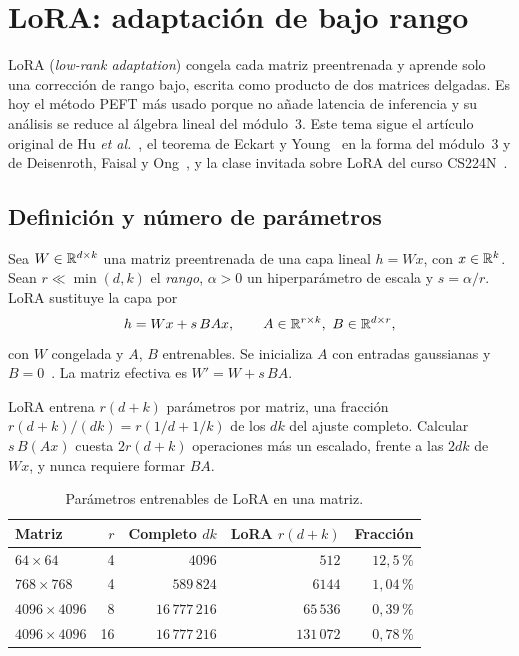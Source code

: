 \chapter{LoRA: adaptación de bajo rango}
\label{tema:5}

LoRA (\emph{low-rank adaptation}) congela cada matriz preentrenada y aprende solo una corrección de rango bajo, escrita como producto de dos matrices delgadas. Es hoy el método PEFT más usado porque no añade latencia de inferencia y su análisis se reduce al álgebra lineal del módulo~3. Este tema sigue el artículo original de Hu \emph{et al.}~\cite[§4 y~§7]{hu-lora}, el teorema de Eckart y Young~\cite{eckart-young} en la forma del módulo~3 y de Deisenroth, Faisal y Ong~\cite[§4.6]{mml}, y la clase invitada sobre LoRA del curso CS224N~\cite{cs224n}.

\section{Definición y número de parámetros}

\begin{definicion}[LoRA]\label{def:lora}
Sea $W\in\mathbb{R}^{d\times k}$ una matriz preentrenada de una capa lineal $h=Wx$, con $x\in\mathbb{R}^{k}$. Sean $r\ll\min(d,k)$ el \emph{rango}, $\alpha>0$ un hiperparámetro de escala y $s=\alpha/r$. LoRA sustituye la capa por
\[
h=Wx+s\,BAx,\qquad A\in\R^{r\times k},\ B\in\R^{d\times r},
\]
con $W$ congelada y $A$, $B$ entrenables. Se inicializa $A$ con entradas gaussianas y $B=0$~\cite[§4.1]{hu-lora}. La matriz efectiva es $W'=W+s\,BA$.
\end{definicion}

\addtocounter{figure}{1}%

\begin{proposicion}\label{prop:lora-param}
LoRA entrena $r(d+k)$ parámetros por matriz, una fracción $r(d+k)/(dk)=r(1/d+1/k)$ de los $dk$ del ajuste completo. Calcular $s\,B(Ax)$ cuesta $2r(d+k)$ operaciones más un escalado, frente a las $2dk$ de $Wx$, y nunca requiere formar $BA$.
\end{proposicion}

\begin{table}[h]
\centering\small
\caption{Parámetros entrenables de LoRA en una matriz.}\label{tab:lora}
\begin{tabular}{@{}lrrrr@{}}
\toprule
Matriz & $r$ & Completo $dk$ & LoRA $r(d+k)$ & Fracción \\
\midrule
$64\times 64$ & 4 & $4096$ & $512$ & $12{,}5\,\%$ \\
$768\times 768$ & 4 & $589\,824$ & $6144$ & $1{,}04\,\%$ \\
$4096\times 4096$ & 8 & $16\,777\,216$ & $65\,536$ & $0{,}39\,\%$ \\
$4096\times 4096$ & 16 & $16\,777\,216$ & $131\,072$ & $0{,}78\,\%$ \\
\bottomrule
\end{tabular}
\end{table}

